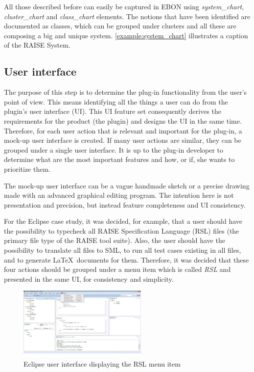\documentclass[conference]{IEEEtran}
\begin{document}
All those described before can easily be captured in EBON using
\emph{system\_chart}, \emph{cluster\_chart} and \emph{class\_chart}
elements. The notions that have been identified are documented as
classes, which can be grouped under clusters and all these are
composing a big and unique system. \autoref{example:system_chart}
illustrates a caption of the RAISE System.

%
\subsection{User interface}
\label{sec:user-interface}

The purpose of this step is to determine the plug-in functionality from the
user's point of view. This means identifying all the things a user can
do from the plugin's user interface (UI). This UI feature set
consequently derives the requirements for the product (the plugin) and
designs the UI in the same time. Therefore, for each user action that
is relevant and important for the plug-in, a mock-up user interface is
created. If many user actions are similar, they can be grouped under a
single user interface. It is up to the plug-in developer to determine
what are the most important features and how, or if, she wants to
prioritize them.

The mock-up user interface can be a vague handmade sketch or a
precise drawing made with an advanced graphical editing program.  The
intention here is not presentation and precision, but instead feature
completeness and UI consistency.

For the Eclipse case study, it was decided, for example, that a user
should have the possibility to typecheck all RAISE Specification
Language (RSL) files (the primary file type of the RAISE tool suite).
Also, the user should have the possibility to translate all files to
SML, to run all test cases existing in all files, and to generate
\LaTeX\ documents for them.  Therefore, it was decided that these four
actions should be grouped under a menu item which is called \emph{RSL}
and presented in the same UI, for consistency and simplicity.  

\begin{figure}[!t] \centering
\includegraphics[width=2.5in]{RSLMenu.jpeg} 
\caption{Eclipse user interface displaying the RSL menu item} 
\label{UIMenu} 
\end{figure}
\end{document}
